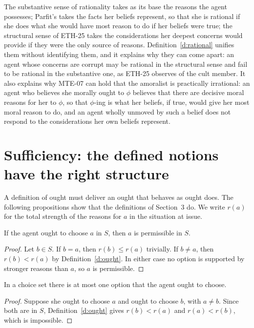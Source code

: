 \documentclass{situationist-preprint}
\begin{document}
The substantive sense of rationality takes as its base the reasons the agent possesses; Parfit's takes the facts her beliefs represent, so that she is rational if she does what she would have most reason to do if her beliefs were true; the structural sense of ETH-25 takes the considerations her deepest concerns would provide if they were the only source of reasons. Definition~\ref{d:rational} unifies them without identifying them, and it explains why they can come apart: an agent whose concerns are corrupt may be rational in the structural sense and fail to be rational in the substantive one, as ETH-25 observes of the cult member. It also explains why MTE-07 can hold that the amoralist is practically irrational: an agent who believes she morally ought to $\phi$ believes that there are decisive moral reasons for her to $\phi$, so that $\phi$-ing is what her beliefs, if true, would give her most moral reason to do, and an agent wholly unmoved by such a belief does not respond to the considerations her own beliefs represent.

\section{Sufficiency: the defined notions have the right structure}\label{s:suff}

A definition of ought must deliver an ought that behaves as ought does. The following propositions show that the definitions of Section~3 do. We write $r(a)$ for the total strength of the reasons for $a$ in the situation at issue.

\begin{proposition}\label{p:oim}
If the agent ought to choose $a$ in $S$, then $a$ is permissible in $S$.
\end{proposition}

\begin{proof}
Let $b\in S$. If $b=a$, then $r(b)\le r(a)$ trivially. If $b\neq a$, then $r(b)<r(a)$ by Definition~\ref{d:ought}. In either case no option is supported by stronger reasons than $a$, so $a$ is permissible.
\end{proof}

\begin{proposition}\label{p:cons}
In a choice set there is at most one option that the agent ought to choose.
\end{proposition}

\begin{proof}
Suppose she ought to choose $a$ and ought to choose $b$, with $a\neq b$. Since both are in $S$, Definition~\ref{d:ought} gives $r(b)<r(a)$ and $r(a)<r(b)$, which is impossible.
\end{proof}
\end{document}
